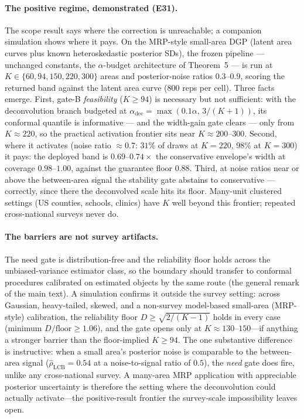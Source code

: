 \documentclass[12pt]{article}
\theoremstyle{definition}
\theoremstyle{remark}
\newcommand{\rhohat}{\widehat{\rho}}
\begin{document}
\paragraph{The positive regime, demonstrated (E31).} The scope result says where the
correction is unreachable; a companion simulation shows where it pays. On the
MRP-style small-area DGP (latent area curves plus known heteroskedastic posterior
SDs), the frozen pipeline --- unchanged constants, the $\alpha$-budget architecture of
Theorem~5 --- is run at $K\in\{60,94,150,220,300\}$ areas and posterior-noise
ratios $0.3$--$0.9$, scoring the returned band against the latent area curve
($800$ reps per cell). Three facts emerge. First, gate-B \emph{feasibility}
($K\ge94$) is necessary but not sufficient: with the deconvolution branch
budgeted at $\alpha_{\text{dec}}=\max(0.1\alpha,\,3/(K{+}1))$, its conformal quantile
is informative --- and the width-gain gate clears --- only from $K\approx220$, so the
practical activation frontier sits near $K\approx200$--$300$. Second, where it
activates (noise ratio $\approx0.7$: $31\%$ of draws at $K{=}220$, $98\%$ at
$K{=}300$) it pays: the deployed band is $0.69$--$0.74\times$ the conservative
envelope's width at coverage $0.98$--$1.00$, against the guarantee floor $0.88$.
Third, at noise ratios near or above the between-area signal the stability gate
abstains to conservative --- correctly, since there the deconvolved scale hits its
floor. Many-unit clustered settings (US counties, schools, clinics) have $K$ well
beyond this frontier; repeated cross-national surveys never do.

\paragraph{The barriers are not survey artifacts.} The need gate is
distribution-free and the reliability floor holds across the
unbiased-variance estimator class, so the boundary should transfer to
conformal procedures calibrated on estimated objects by the same route
(the general remark of the main text). A simulation confirms it outside the survey
setting: across Gaussian, heavy-tailed, skewed, and a
non-survey model-based small-area (MRP-style) calibration, the reliability floor
$D\ge\sqrt{2/(K-1)}$ holds in every case (minimum $D/\text{floor}\ge1.06$), and the gate
opens only at $K\approx130$--$150$---if anything a stronger barrier than the
floor-implied $K\ge94$. The one substantive difference is instructive: when a small
area's posterior noise is comparable to the between-area signal
($\rhohat_{\mathrm{LCB}}=0.54$ at a noise-to-signal ratio of $0.5$), the \emph{need} gate
does fire, unlike any cross-national survey. A many-area MRP application with appreciable
posterior uncertainty is therefore the setting where the deconvolution could actually
activate---the positive-result frontier the survey-scale impossibility leaves open.
\end{document}
